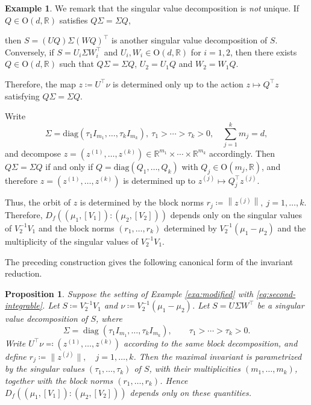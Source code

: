 \documentclass[a4paper, reqno, 11pt]{article}
\newtheorem{Prop}[Thm]{Proposition}
\theoremstyle{definition}
\newtheorem{Exa}[Thm]{Example}
\def\O{\mathrm{O}}
\begin{document}
\begin{Exa}
We remark that the singular value decomposition is {\it not} unique. 
If $Q\in \O(d,\mathbb{R})$ satisfies $Q\Sigma = \Sigma Q$, 

then $S = (UQ)\Sigma(WQ)^\top$ is another singular value decomposition  of $S$. 
Conversely, if $S = U_i \Sigma W_i^\top$ and $U_i, W_i \in \O(d,\mathbb{R})$ for $i=1,2$, then 
there exists $Q \in \O(d,\mathbb{R})$ such that $Q\Sigma = \Sigma Q$, $U_2 = U_1 Q$ and $W_2 = W_1 Q$. 

Therefore, the map $z \coloneqq  U^\top \nu$ is determined only up to the action
$z\mapsto Q^\top z$ satisfying $Q\Sigma = \Sigma Q$.

Write 
\[ \Sigma = \mathrm{diag}\left(\tau_1 I_{m_1},\dots,\tau_k I_{m_k} \right), \ \tau_1 > \cdots > \tau_k > 0, \quad \sum_{j=1}^k m_j = d, \]
and decompose $z = (z^{(1)},\dots,z^{(k)}) \in \mathbb{R}^{m_1} \times \cdots \times \mathbb{R}^{m_k}$ accordingly. 
Then $Q\Sigma = \Sigma Q$ if and only if $Q = \mathrm{diag}(Q_1,\dots,Q_k)$ with
$Q_j\in \O(m_j, \mathbb{R})$, and therefore $z = (z^{(1)},\dots,z^{(k)})$ is determined up to
$z^{(j)} \mapsto Q_j^\top z^{(j)}$.

Thus, the orbit of $z$ is determined by the block norms
$r_j \coloneqq  \left\| z^{(j)} \right\|, \  j = 1,\dots,k$. 
Therefore, $D_{f} \left((\mu_1,[V_1]):(\mu_2,[V_2]) \right)$ depends only on
the singular values of $V_2^{-1}V_1$ and the block norms $(r_1,\dots,r_k)$ determined by $V_2^{-1}(\mu_1 - \mu_2)$ and the multiplicity of the singular values of $V_2^{-1}V_1$.
\end{Exa}

The preceding construction gives the following canonical form of the invariant reduction.

\begin{Prop}
Suppose the setting of Example \ref{exa:modified} with \eqref{eq:second-integrable}. 
Let 
$S \coloneqq  V_2^{-1}V_1$ and $\nu \coloneqq  V_2^{-1}(\mu_1-\mu_2)$. 
Let $S = U\Sigma W^\top$ be a singular value decomposition of $S$, where
\[ \Sigma = \operatorname{diag}(\tau_1 I_{m_1},\ldots,\tau_k I_{m_k}), \qquad \tau_1 > \cdots > \tau_k >0. \]
Write
$U^{\top} \nu \eqqcolon \left(z^{(1)},\ldots,z^{(k)} \right)$ 
according to the same block decomposition, and define
$r_j \coloneqq \|z^{(j)}\|,\quad j=1,\ldots,k$.
Then the maximal invariant is parametrized by the singular values $(\tau_1, \dots, \tau_k)$ of $S$, with their multiplicities $(m_1, \dots, m_k)$, together with the block norms
$(r_1, \dots, r_k)$. 
Hence $D_f\left((\mu_1,[V_1]):(\mu_2,[V_2])\right)$ depends only on these quantities.
\end{Prop}
\end{document}
